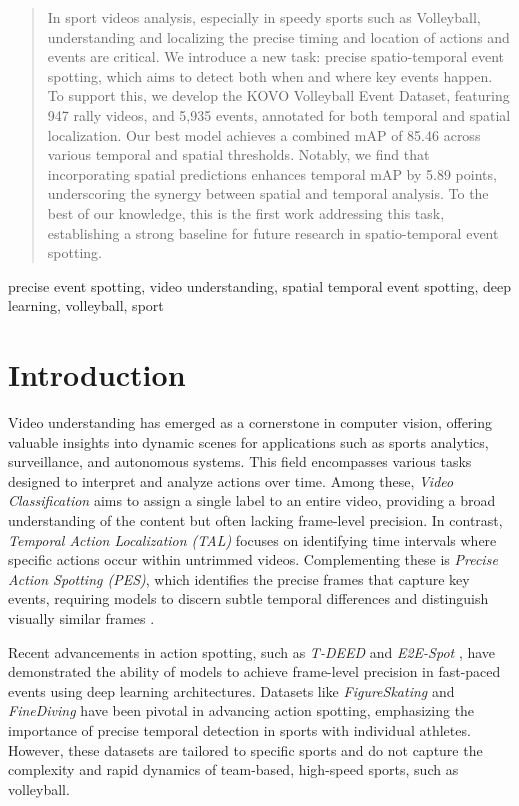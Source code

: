 \documentclass[conference]{IEEEtran}
\begin{document}
\begin{abstract}
    In sport videos analysis, especially in speedy sports such as Volleyball, understanding and localizing the precise timing and location of actions and events are critical. We introduce a new task: precise spatio-temporal event spotting, which aims to detect both when and where key events happen. To support this, we develop the KOVO Volleyball Event Dataset, featuring 947 rally videos, and 5,935 events, annotated for both temporal and spatial localization. Our best model achieves a combined mAP of 85.46 across various temporal and spatial thresholds. Notably, we find that incorporating spatial predictions enhances temporal mAP by 5.89 points, underscoring the synergy between spatial and temporal analysis. To the best of our knowledge, this is the first work addressing this task, establishing a strong baseline for future research in spatio-temporal event spotting.
\end{abstract}

\begin{IEEEkeywords}
precise event spotting, video understanding, spatial temporal event spotting, deep learning, volleyball, sport
\end{IEEEkeywords}

\section{Introduction}

Video understanding has emerged as a cornerstone in computer vision, offering valuable insights into dynamic scenes for applications such as sports analytics, surveillance, and autonomous systems. This field encompasses various tasks designed to interpret and analyze actions over time. Among these, \textit{Video Classification} aims to assign a single label to an entire video, providing a broad understanding of the content but often lacking frame-level precision. In contrast, \textit{Temporal Action Localization (TAL)} focuses on identifying time intervals where specific actions occur within untrimmed videos. Complementing these is \textit{Precise Action Spotting (PES)}, which identifies the precise frames that capture key events, requiring models to discern subtle temporal differences and distinguish visually similar frames \cite{spot22}.

Recent advancements in action spotting, such as \textit{T-DEED} \cite{tdeed23} and \textit{E2E-Spot} \cite{spot22}, have demonstrated the ability of models to achieve frame-level precision in fast-paced events using deep learning architectures. Datasets like \textit{FigureSkating} \cite{figureskating} and \textit{FineDiving} \cite{finediving} have been pivotal in advancing action spotting, emphasizing the importance of precise temporal detection in sports with individual athletes. However, these datasets are tailored to specific sports and do not capture the complexity and rapid dynamics of team-based, high-speed sports, such as volleyball.
\end{document}
